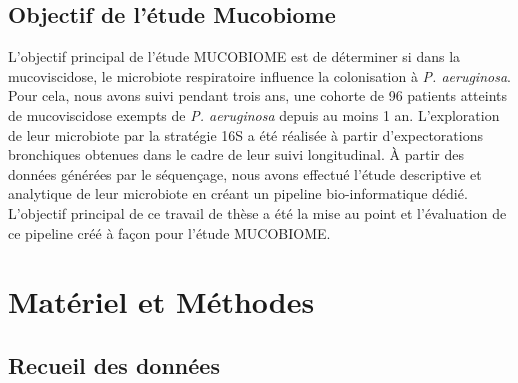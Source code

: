 \documentclass[12pt,a4paper]{article}
\begin{document}
\subsection{Objectif de l'étude Mucobiome}
L'objectif principal de l'étude MUCOBIOME est de déterminer si dans la mucoviscidose, le microbiote respiratoire influence la colonisation à \textit{P. aeruginosa}.
Pour cela, nous avons suivi pendant trois ans,  une cohorte de 96 patients atteints de mucoviscidose exempts de \textit{P. aeruginosa} depuis au moins 1 an.
L'exploration de leur microbiote par la stratégie 16S a été réalisée à partir d'expectorations bronchiques obtenues dans le cadre de leur suivi longitudinal.
À partir des données générées par le séquençage, nous avons effectué l'étude descriptive et analytique de leur microbiote en créant un pipeline bio-informatique dédié. L'objectif principal de ce travail de thèse a été la mise au point et l'évaluation de ce pipeline créé à façon pour l'étude MUCOBIOME.
\newpage
\section{Matériel et Méthodes}
\subsection{Recueil des données}
\end{document}
